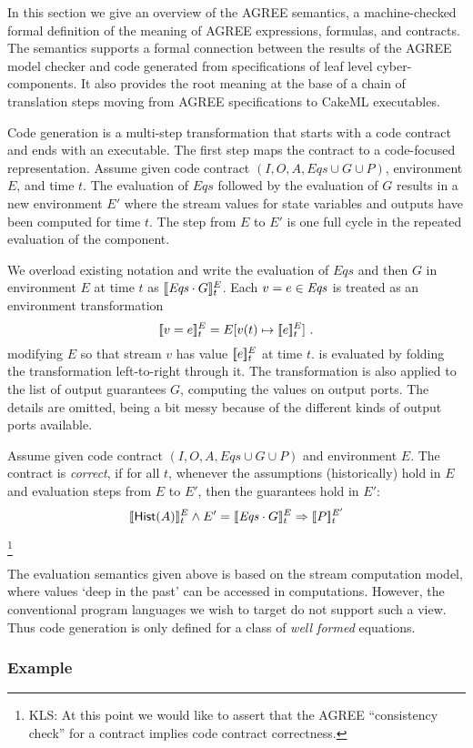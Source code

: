 In this section we give an overview of the AGREE semantics, a
machine-checked formal definition of the meaning of AGREE expressions,
formulas, and contracts. The semantics supports a formal connection
between the results of the AGREE model checker and code generated from
specifications of leaf level cyber-components. It also provides the root
meaning at the base of a chain of translation steps moving from AGREE
specifications to CakeML executables.

Code generation is a multi-step transformation that starts with a code
contract and ends with an executable. The first step maps the contract
to a code-focused representation. Assume given code contract
$(I,O,A,\mathit{Eqs} \cup G \cup P)$, environment $E$, and time
$t$. The evaluation of $\mathit{Eqs}$ followed by the evaluation of
$G$ results in a new environment $E'$ where the stream values for
state variables and outputs have been computed for time $t$. The step
from $E$ to $E'$ is one full cycle in the repeated evaluation of the
component.

\begin{definition}[Evaluation]
We overload existing notation and write the evaluation of
$\mathit{Eqs}$ and then $G$ in environment $E$ at time $t$ as
$[\![ \mathit{Eqs}\cdot G ]\!]^E_t$. Each $v = e \in {\ensuremath{\mathit{Eqs}}}$ is treated as
an environment transformation
\[
 [\![ v = e ]\!]^E_t = E[v(t) \mapsto[\![ e ]\!]^E_t] \ .
\]
modifying $E$ so that stream $v$ has value $[\![ e ]\!]^E_t$ at time $t$.
{\Eqs} is evaluated by folding the transformation left-to-right
through it. The transformation is also applied to the list of output
guarantees $G$, computing the values on output ports. The details are
omitted, being a bit messy because of the different kinds of output
ports available.
\end{definition}


\begin{definition}
Assume given code contract $(I,O,A,\mathit{Eqs} \cup G \cup P)$ and
environment $E$.  The contract is \emph{correct}, if for all $t$,
whenever the assumptions (historically) hold in $E$ and evaluation
steps from $E$ to $E'$, then the guarantees hold in $E'$:
\[
[\![ \mathsf{Hist}(A) ]\!]^E_t \land E' = [\![ \mathit{Eqs} \cdot G ]\!]^E_t \Rightarrow [\![ P ]\!]^{E'}_t
\]
\end{definition}
\footnote
{KLS: At this point we would like to assert that the AGREE ``consistency
 check'' for a contract implies code contract correctness.}

The evaluation semantics given above is based on the stream
computation model, where values `deep in the past' can be accessed in
computations. However, the conventional program languages we wish to
target do not support such a view. Thus code generation is only
defined for a class of \emph{well formed} equations.

\begin{definition}[Wellformedness]

\end{definition}

\subsubsection{Example}
